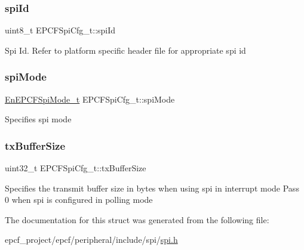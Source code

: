 \subsubsection{\texorpdfstring{spi\+Id}{spiId}}
{\footnotesize\ttfamily uint8\+\_\+t E\+P\+C\+F\+Spi\+Cfg\+\_\+t\+::spi\+Id}

Spi Id. Refer to platform specific header file for appropriate spi id \mbox{\label{structEPCFSpiCfg__t_a3e83f10555a722009e6699fb889a001a}} 
\subsubsection{\texorpdfstring{spi\+Mode}{spiMode}}
{\footnotesize\ttfamily \mbox{\hyperlink{spi_8h_a236709e1f18b5113eef01990887fe91b}{En\+E\+P\+C\+F\+Spi\+Mode\+\_\+t}} E\+P\+C\+F\+Spi\+Cfg\+\_\+t\+::spi\+Mode}

Specifies spi mode \mbox{\label{structEPCFSpiCfg__t_aecb6de093296bddc9816d78f6b0e1e43}} 
\subsubsection{\texorpdfstring{tx\+Buffer\+Size}{txBufferSize}}
{\footnotesize\ttfamily uint32\+\_\+t E\+P\+C\+F\+Spi\+Cfg\+\_\+t\+::tx\+Buffer\+Size}

Specifies the transmit buffer size in bytes when using spi in interrupt mode Pass 0 when spi is configured in polling mode 

The documentation for this struct was generated from the following file\+:\begin{DoxyCompactItemize}
\item 
epcf\+\_\+project/epcf/peripheral/include/spi/\mbox{\hyperlink{spi_8h}{spi.\+h}}\end{DoxyCompactItemize}
